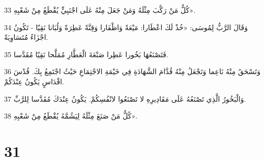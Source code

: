 \par 33 كُلُّ مَنْ رَكَّبَ مِثْلَهُ وَمَنْ جَعَلَ مِنْهُ عَلَى اجْنَبِيٍّ يُقْطَعُ مِنْ شَعْبِهِ».
\par 34 وَقَالَ الرَّبُّ لِمُوسَى: «خُذْ لَكَ اعْطَارا: مَيْعَةً وَاظْفَارا وَقِنَّةً عَطِرَةً وَلُبَانا نَقِيّا - تَكُونُ اجْزَاءً مُتَسَاوِيَةً.
\par 35 فَتَصْنَعُهَا بَخُورا عَطِرا صَنْعَةَ الْعَطَّارِ مُمَلَّحا نَقِيّا مُقَدَّسا.
\par 36 وَتَسْحَقُ مِنْهُ نَاعِما وَتَجْعَلُ مِنْهُ قُدَّامَ الشَّهَادَةِ فِي خَيْمَةِ الاجْتِمَاعِ حَيْثُ اجْتَمِعُ بِكَ. قُدْسَ اقْدَاسٍ يَكُونُ عِنْدَكُمْ.
\par 37 وَالْبَخُورُ الَّذِي تَصْنَعُهُ عَلَى مَقَادِيرِهِ لا تَصْنَعُوا لانْفُسِكُمْ. يَكُونُ عِنْدَكَ مُقَدَّسا لِلرَّبِّ.
\par 38 كُلُّ مَنْ صَنَعَ مِثْلَهُ لِيَشُمَّهُ يُقْطَعُ مِنْ شَعْبِهِ».

\chapter{31}

